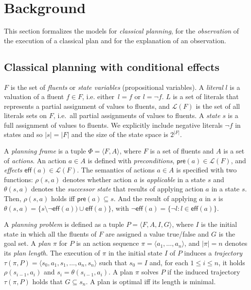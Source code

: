 \documentclass[runningheads]{llncs}
\newcommand{\tup}[1]{{\langle #1 \rangle}}
\newcommand{\pre}{\mathsf{pre}}     %
\newcommand{\eff}{\mathsf{eff}}     %
\begin{document}
\section{Background}
This section formalizes the models for {\em classical planning}, for the {\em observation} of the execution of a classical plan and for the explanation of an observation.

\subsection{Classical planning with conditional effects}
$F$ is the set of {\em fluents} or {\em state variables} (propositional variables). A {\em literal} $l$ is a valuation of a fluent $f\in F$, i.e. either~$l=f$ or $l=\neg f$. $L$ is a set of literals that represents a partial assignment of values to fluents, and $\mathcal{L}(F)$ is the set of all literals sets on $F$, i.e.~all partial assignments of values to fluents. A {\em state} $s$ is a full assignment of values to fluents. We explicitly include negative literals $\neg f$ in states and so $|s|=|F|$ and the size of the state space is $2^{|F|}$.

A {\em planning frame} is a tuple $\Phi=\tup{F,A}$, where $F$ is a set of fluents and $A$ is a set of \emph{actions}. An action $a\in A$ is defined with {\em preconditions}, $\pre(a)\in\mathcal{L}(F)$,  and {\em effects} $\eff(a)\in\mathcal{L}(F)$. The semantics of actions $a\in A$ is specified with two functions: $\rho(s,a)$ denotes whether action $a$ is {\em applicable} in a state $s$ and $\theta(s,a)$ denotes the {\em successor state} that results of applying action $a$ in a state $s$. Then, $\rho(s,a)$ holds iff $\pre(a)\subseteq s$. And the result of applying $a$ in $s$ is $\theta(s,a)=\{s\setminus\neg\eff(a))\cup\eff(a)\}$, with $\neg\eff(a) = \{\neg l : l \in \eff(a)\}$.

A {\em planning problem} is defined as a tuple $P=\tup{F,A,I,G}$, where $I$ is the initial state in which all the fluents of $F$ are assigned a value true/false and $G$ is the goal set. A {\em plan} $\pi$ for $P$ is an action sequence $\pi=\tup{a_1, \ldots, a_n}$, and $|\pi|=n$ denotes its {\em plan length}. The execution of $\pi$ in the initial state $I$ of $P$ induces a {\em trajectory} $\tau(\pi,P)=\tup{s_0, a_1, s_1, \ldots, a_n, s_n}$ such that $s_0=I$ and, for each {\small $1\leq i\leq n$}, it holds $\rho(s_{i-1},a_i)$ and $s_i=\theta(s_{i-1},a_i)$. A plan $\pi$ solves $P$ if the induced trajectory $\tau(\pi,P)$ holds that $G \subseteq s_n$. A plan is optimal iff its length is minimal.
\end{document}
